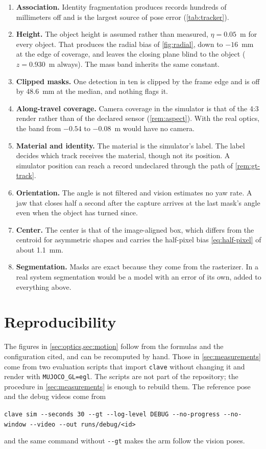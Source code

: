 \documentclass[11pt,a4paper]{article}
\theoremstyle{definition}
\theoremstyle{remark}
\newcommand{\code}[1]{\texttt{#1}}
\begin{document}
\begin{enumerate}[leftmargin=*]
\item \textbf{Association.} Identity fragmentation produces records hundreds of
  millimeters off and is the largest source of pose error (\cref{tab:tracker}).
\item \textbf{Height.} The object height is assumed rather than measured,
  $\eta = 0.05$~m for every object. That produces the radial bias of
  \cref{fig:radial}, down to $-16$~mm at the edge of coverage, and leaves the
  closing plane blind to the object ($z = 0.930$~m always). The mass band
  inherits the same constant.
\item \textbf{Clipped masks.} One detection in ten is clipped by the frame edge
  and is off by 48.6~mm at the median, and nothing flags it.
\item \textbf{Along-travel coverage.} Camera coverage in the simulator is that of
  the 4:3 render rather than of the declared sensor (\cref{rem:aspect}). With the
  real optics, the band from $-0.54$ to $-0.08$~m would have no camera.
\item \textbf{Material and identity.} The material is the simulator's label. The
  label decides which track receives the material, though not its position. A
  simulator position can reach a record undeclared through the path of
  \cref{rem:gt-track}.
\item \textbf{Orientation.} The angle is not filtered and vision estimates no
  yaw rate. A jaw that closes half a second after the capture arrives at the last
  mask's angle even when the object has turned since.
\item \textbf{Center.} The center is that of the image-aligned box, which differs
  from the centroid for asymmetric shapes and carries the half-pixel bias
  \eqref{eq:half-pixel} of about 1.1~mm.
\item \textbf{Segmentation.} Masks are exact because they come from the
  rasterizer. In a real system segmentation would be a model with an error of its
  own, added to everything above.
\end{enumerate}

\section{Reproducibility}

The figures in \cref{sec:optics,sec:motion} follow from the formulas and the
configuration cited, and can be recomputed by hand. Those in
\cref{sec:measurements} come from two evaluation scripts that import
\code{clave} without changing it and render with \code{MUJOCO\_GL=egl}. The
scripts are not part of the repository; the procedure in
\cref{sec:measurements} is enough to rebuild them. The reference pose and the
debug videos come from
\begin{center}
\code{clave sim -{}-seconds 30 -{}-gt -{}-log-level DEBUG -{}-no-progress -{}-no-window -{}-video -{}-out runs/debug/<id>}
\end{center}
and the same command without \code{-{}-gt} makes the arm follow the vision poses.
\end{document}
